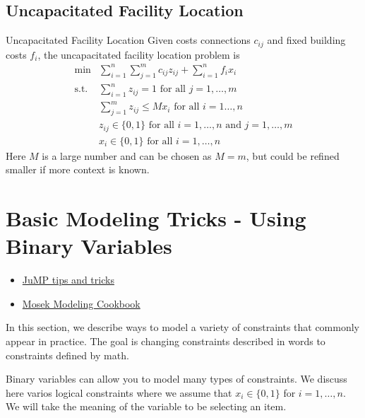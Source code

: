 \subsection{Uncapacitated Facility Location}

\begin{general}{Uncapacitated Facility Location}{\npcomplete}
Given costs connections $c_{ij}$ and fixed building costs $f_i$, the uncapacitated facility location problem is 
\begin{equation}
\begin{array}{rl}
\min & \displaystyle\sum_{i=1}^n\sum_{j=1}^mc_{ij}z_{ij}+\sum_{i=1}^nf_ix_i \\
\text{s.t.} & \displaystyle\sum_{i=1}^nz_{ij}=1 \text{ for all }j=1,\dots,m \\
& \displaystyle \sum_{j=1}^mz_{ij}\leqslant Mx_i\text{ for all }i=1\dots,n \\
&z_{ij}\in\{0,1\}\text{ for all }i=1,\dots,n \text{ and }j=1,\dots,m\\
&x_i\in\{0,1\}\text{ for all } i=1,\dots,n
\end{array}
\end{equation}
Here $M$ is a large number and can be chosen as $M = m$, but could be refined smaller if more context is known.
\end{general}


\section{Basic Modeling Tricks - Using Binary Variables}
\begin{resource}
\begin{itemize}
\item \href{https://jump.dev/JuMP.jl/stable/tutorials/linear/tips_and_tricks/}{JuMP tips and tricks}
\item \href{https://docs.mosek.com/modeling-cookbook/mio.html}{Mosek Modeling Cookbook}
\end{itemize}
\end{resource}
In this section, we describe ways to model a variety of constraints that commonly appear in practice.  The goal is changing constraints described in words to constraints defined by math.

Binary variables can allow you to model many types of constraints.  We discuss here varios logical constraints where we assume that $x_i \in \{0,1\}$ for $i=1, \dots, n$.  We will take the meaning of the variable to be selecting an item.

